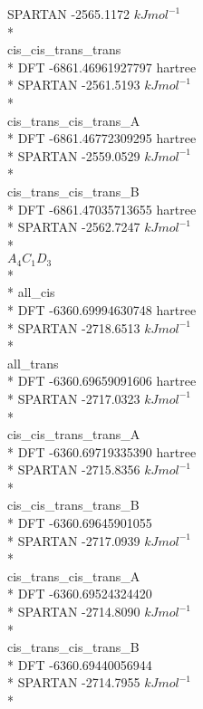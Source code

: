 \documentclass{article}
\begin{document}
    SPARTAN -2565.1172 \(kJmol^{-1}\)\\*\\
    cis\_cis\_trans\_trans\\*
    DFT -6861.46961927797 hartree\\*
    SPARTAN -2561.5193 \(kJmol^{-1}\)\\*\\
    cis\_trans\_cis\_trans\_A\\*
    DFT  -6861.46772309295 hartree\\*
    SPARTAN -2559.0529 \(kJmol^{-1}\)\\*\\
    cis\_trans\_cis\_trans\_B\\*
    DFT -6861.47035713655 hartree\\*
    SPARTAN -2562.7247 \(kJmol^{-1}\)\\*\\
\(A_{4}C_{1}D_{3}\)\\*\\*
    all\_cis\\*
    DFT -6360.69994630748 hartree\\*
    SPARTAN -2718.6513 \(kJmol^{-1}\)\\*\\
    all\_trans\\*
    DFT -6360.69659091606 hartree\\*
    SPARTAN -2717.0323 \(kJmol^{-1}\)\\*\\
    cis\_cis\_trans\_trans\_A\\*
    DFT -6360.69719335390 hartree\\*
    SPARTAN -2715.8356 \(kJmol^{-1}\)\\*\\
    cis\_cis\_trans\_trans\_B\\*
    DFT  -6360.69645901055\\*
    SPARTAN -2717.0939 \(kJmol^{-1}\)\\*\\
    cis\_trans\_cis\_trans\_A\\*
    DFT -6360.69524324420 \\*
    SPARTAN -2714.8090 \(kJmol^{-1}\)\\*\\
    cis\_trans\_cis\_trans\_B\\*
    DFT -6360.69440056944\\*
    SPARTAN -2714.7955  \(kJmol^{-1}\)\\*\\ 
\end{document}
